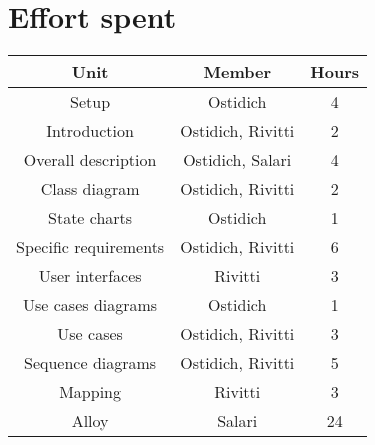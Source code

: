 \chapter{Effort spent}

\begin{table}[h]
    \centering
    \begin{tabular}{|c|c|c|}
        \hline \textbf{Unit} & \textbf{Member} & \textbf{Hours} \\
        \hline Setup & Ostidich & 4 \\
        \hline Introduction & Ostidich, Rivitti & 2 \\
        \hline Overall description & Ostidich, Salari & 4 \\
        \hline Class diagram & Ostidich, Rivitti & 2 \\
        \hline State charts & Ostidich & 1 \\
        \hline Specific requirements & Ostidich, Rivitti & 6 \\
        \hline User interfaces & Rivitti & 3 \\
        \hline Use cases diagrams & Ostidich & 1 \\
        \hline Use cases & Ostidich, Rivitti & 3 \\
        \hline Sequence diagrams & Ostidich, Rivitti & 5 \\
        \hline Mapping & Rivitti & 3 \\
        \hline Alloy & Salari & 24 \\
        \hline
    \end{tabular}
\end{table}

